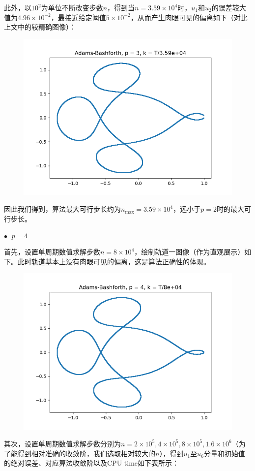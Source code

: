 \documentclass{ctexart}
\begin{document}
\begin{sloppypar}
此外，以$10^2$为单位不断改变步数$n$，得到当$n = 3.59 \times 10^4$时，$u_1$和$u_2$的误差较大值为$4.96 \times 10^{-2}$，最接近给定阈值$5 \times 10^{-2}$，从而产生肉眼可见的偏离如下（对比上文中的较精确图像）：
\begin{figure}[H]
\centering
\includegraphics[scale = 0.45]{./report_src/Figure_6.png}
\end{figure}
因此我们得到，算法最大可行步长约为$n_{\max} = 3.59 \times 10^4$，远小于$p=2$时的最大可行步长。

$\bullet \;$ $p = 4$

首先，设置单周期数值求解步数$n = 8 \times 10^4$，绘制轨道一图像（作为直观展示）如下。此时轨道基本上没有肉眼可见的偏离，这是算法正确性的体现。
\begin{figure}[H]
\centering
\includegraphics[scale = 0.45]{./report_src/Figure_7.png}
\end{figure}
其次，设置单周期数值求解步数分别为$n = 2 \times 10^5,4 \times 10^5,8 \times 10^5, 1.6 \times 10^6$（为了能得到相对准确的收敛阶，我们选取相对较大的$n$），得到$u_1$至$u_6$分量和初始值的绝对误差、对应算法收敛阶以及CPU time如下表所示：


\end{sloppypar}
\end{document}
